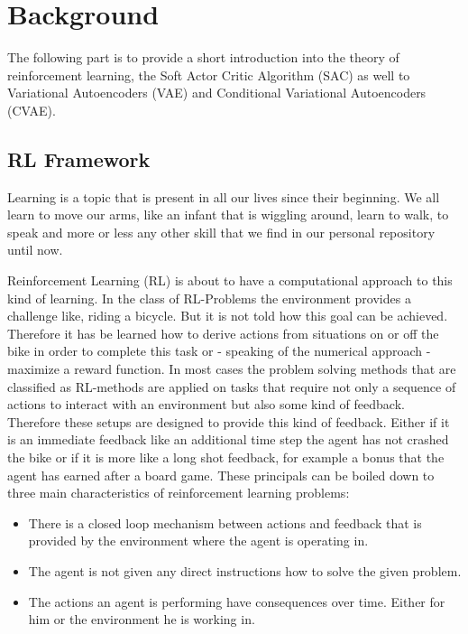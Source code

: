 \chapter{Background}\label{chap:background}

The following part is to provide a short introduction into the theory of reinforcement learning, the Soft Actor Critic Algorithm (SAC) as well to Variational Autoencoders (VAE) and Conditional Variational Autoencoders (CVAE).



\section{RL Framework}\label{sec:RL-Framework}

Learning is a topic that is present in all our lives since their beginning. We all learn to move our arms, like an infant that is wiggling around, learn to walk, to speak and more or less any other skill that we find in our personal repository until now.  

Reinforcement Learning (RL) is about to have a computational approach to this kind of learning.
In the class of RL-Problems the environment provides a challenge like, riding a bicycle. But it is not told how this goal can be achieved.  Therefore it has be learned how to derive actions from situations on or off the bike in order to complete this task or - speaking of the numerical approach - maximize a reward function.
In most cases the problem solving methods that are classified as RL-methods are applied on tasks that require not only a sequence of actions to interact with an environment but also some kind of feedback.
Therefore these setups are designed to provide this kind of feedback. Either if it is an immediate feedback like an additional time step the agent has not crashed the bike or if it is more like a long shot feedback, for example a bonus that the agent has earned after a board game. 
These principals can be boiled down to three main characteristics of reinforcement learning problems:

\begin{itemize}
    \item There is a closed loop mechanism between actions and feedback that is provided by the environment where the agent is operating in.
    \item The agent is not given any direct instructions how to solve the given problem.
    \item The actions an agent is performing have consequences over time. Either for him or the environment he is working in.  
\end{itemize}

